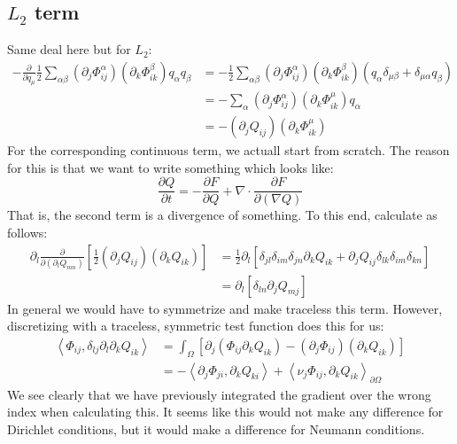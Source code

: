 \documentclass[reqno]{article}
\begin{document}
\subsection{$L_2$ term}

Same deal here but for $L_2$:
\begin{equation}
\begin{split}
    -\frac{\partial}{\partial q_\mu} 
    \frac12 \sum_{\alpha \beta} \left(\partial_j \Phi^\alpha_{ij} \right) \left(\partial_k \Phi^\beta_{ik} \right) q_\alpha q_\beta
    &=
    - \frac12 \sum_{\alpha \beta} \left(\partial_j \Phi^\alpha_{ij} \right) \left(\partial_k \Phi^\beta_{ik} \right) 
    \left(
        q_\alpha \delta_{\mu \beta}
        + \delta_{\mu \alpha} q_\beta
    \right) \\
    &=
    - \sum_\alpha \left(\partial_j \Phi^\alpha_{ij} \right) \left(\partial_k \Phi^\mu_{ik} \right) q_\alpha \\
    &=
    -\left( \partial_j Q_{ij} \right) \left( \partial_k \Phi^\mu_{ik} \right)
\end{split}
\end{equation}
For the corresponding continuous term, we actuall start from scratch.
The reason for this is that we want to write something which looks like:
\begin{equation}
    \frac{\partial Q}{\partial t}
    =
    -\frac{\partial F}{\partial Q}
    + \nabla \cdot \frac{\partial F}{\partial \left( \nabla Q \right)}
\end{equation}
That is, the second term is a divergence of something.
To this end, calculate as follows:
\begin{equation}
\begin{split}
    \partial_l \frac{\partial}{\partial \left(\partial_l Q_{mn}\right)}
    \left[
        \frac12 \left(\partial_j Q_{ij} \right) \left( \partial_k Q_{ik} \right)
    \right]
    &=
    \frac12 \partial_l \left[
        \delta_{jl} \delta_{im} \delta_{jn} \partial_k Q_{ik}
        + \partial_j Q_{ij} \delta_{lk} \delta_{im} \delta_{kn}
    \right] \\
    &=
    \partial_l \left[
        \delta_{ln} \partial_j Q_{mj}
    \right]
\end{split}
\end{equation}
In general we would have to symmetrize and make traceless this term.
However, discretizing with a traceless, symmetric test function does this for us:
\begin{equation}
\begin{split}
    \left< \Phi_{ij}, \delta_{lj} \partial_l \partial_k Q_{ik} \right>
    &=
    \int_\Omega \left[
        \partial_j \left(\Phi_{ij} \partial_k Q_{ik}\right)
        - \left( \partial_j \Phi_{ij} \right) \left( \partial_k Q_{ik} \right)
    \right] \\
    &=
    -\left< \partial_j \Phi_{ji}, \partial_k Q_{ki} \right>
    + \left< \nu_j \Phi_{ij}, \partial_k Q_{ik} \right>_{\partial \Omega}
\end{split}
\end{equation}
We see clearly that we have previously integrated the gradient over the wrong index when calculating this.
It seems like this would not make any difference for Dirichlet conditions, but it would make a difference for Neumann conditions.
\end{document}
